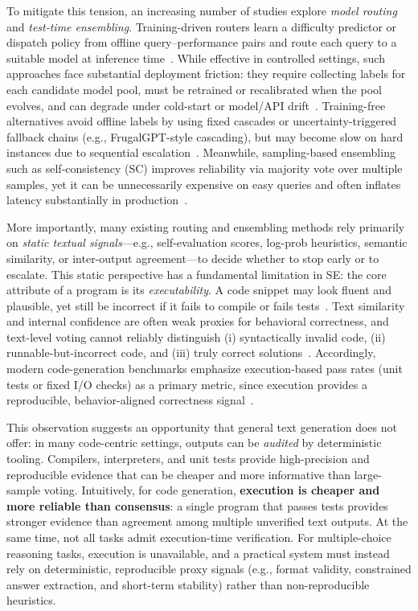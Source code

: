 \documentclass[acmsmall,screen,review,anonymous]{acmart}
\begin{document}
To mitigate this tension, an increasing number of studies explore \emph{model routing} and \emph{test-time ensembling}.
Training-driven routers learn a difficulty predictor or dispatch policy from offline query--performance pairs and route each query to a suitable model at inference time~\cite{ding2024hybrid,ong2024routellm,chen2024routerdc}.
While effective in controlled settings, such approaches face substantial deployment friction: they require collecting labels for each candidate model pool, must be retrained or recalibrated when the pool evolves, and can degrade under cold-start or model/API drift~\cite{zhang2025avengers}.
Training-free alternatives avoid offline labels by using fixed cascades or uncertainty-triggered fallback chains (e.g., FrugalGPT-style cascading), but may become slow on hard instances due to sequential escalation~\cite{chen2023frugalgpt}.
Meanwhile, sampling-based ensembling such as self-consistency (SC) improves reliability via majority vote over multiple samples, yet it can be unnecessarily expensive on easy queries and often inflates latency substantially in production~\cite{wang2023selfconsistency}.

More importantly, many existing routing and ensembling methods rely primarily on \emph{static textual signals}---e.g., self-evaluation scores, log-prob heuristics, semantic similarity, or inter-output agreement---to decide whether to stop early or to escalate.
This static perspective has a fundamental limitation in SE: the core attribute of a program is its \emph{executability}.
A code snippet may look fluent and plausible, yet still be incorrect if it fails to compile or fails tests~\cite{austin2021program,roziere2023codellama}.
Text similarity and internal confidence are often weak proxies for behavioral correctness, and text-level voting cannot reliably distinguish
(i) syntactically invalid code, (ii) runnable-but-incorrect code, and (iii) truly correct solutions~\cite{hou2024large,chen2024survey}.
Accordingly, modern code-generation benchmarks emphasize execution-based pass rates (unit tests or fixed I/O checks) as a primary metric, since execution provides a reproducible, behavior-aligned correctness signal~\cite{yu2024humaneval}.

This observation suggests an opportunity that general text generation does not offer: in many code-centric settings, outputs can be \emph{audited} by deterministic tooling.
Compilers, interpreters, and unit tests provide high-precision and reproducible evidence that can be cheaper and more informative than large-sample voting.
Intuitively, for code generation, \textbf{execution is cheaper and more reliable than consensus}: a single program that passes tests provides stronger evidence than agreement among multiple unverified text outputs.
At the same time, not all tasks admit execution-time verification.
For multiple-choice reasoning tasks, execution is unavailable, and a practical system must instead rely on deterministic, reproducible proxy signals (e.g., format validity, constrained answer extraction, and short-term stability) rather than non-reproducible heuristics.
\end{document}
